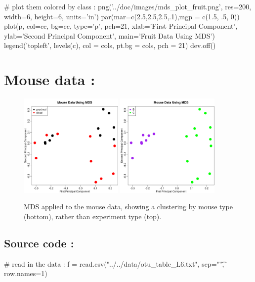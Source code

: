 \begin{multicols*}{2}
\begin{Rs}
# plot them colored by class :
png('../doc/images/mds_plot_fruit.png', res=200, width=6, height=6, units='in')
par(mar=c(2.5,2.5,2.5,.1),mgp = c(1.5, .5, 0))
plot(p, col=cc, bg=cc, type='p', pch=21, xlab='First Principal Component',
     ylab='Second Principal Component', main='Fruit Data Using MDS')
legend('topleft', levels(c), col = cols, pt.bg = cols, pch = 21)
dev.off()
\end{Rs}

\section{Mouse data :}

\begin{figure}[H]
  \centering
    \includegraphics[width=0.45\textwidth]{images/mds_plot_mouse_experiment.png}
    \includegraphics[width=0.45\textwidth]{images/mds_plot_mouse_type.png}
  \caption{MDS applied to the mouse data, showing a clustering by mouse type (bottom), rather than experiment type (top).}
\end{figure}

\subsection{Source code :}

\begin{Rs}
# read in the data :
f = read.csv("../../data/otu_table_L6.txt", sep="\t", row.names=1)


\end{Rs}
\end{multicols*}
